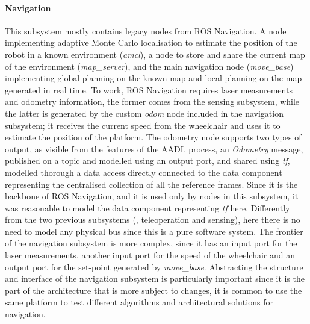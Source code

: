 \paragraph{Navigation} This subsystem mostly contains legacy nodes from ROS Navigation. A node implementing adaptive Monte Carlo localisation to estimate the position of the robot in a known environment (\textit{amcl}), a node to store and share the current map of the environment (\textit{map\_server}), and the main navigation node (\textit{move\_base}) implementing global planning on the known map and local planning on the map generated in real time. To work, ROS Navigation requires laser measurements and odometry information, the former comes from the sensing subsystem, while the latter is generated by the custom \textit{odom} node included in the navigation subsystem; it receives the current speed from the wheelchair and uses it to estimate the position of the platform. The odometry node supports two types of output, as visible from the features of the AADL process, an \textit{Odometry} message, published on a topic and modelled using an output port, and shared using \textit{tf}, modelled thorough a data access directly connected to the data component representing the centralised collection of all the reference frames. Since it is the backbone of ROS Navigation, and it is used only by nodes in this subsystem, it was reasonable to model the data component representing \textit{tf} here. Differently from the two previous subsystems (\ie, teleoperation and sensing), here there is no need to model any physical bus since this is a pure software system. The frontier of the navigation subsystem is more complex, since it has an input port for the laser measurements, another input port for the speed of the wheelchair and  an output port for the set-point generated by \textit{move\_base}. Abstracting the structure and interface of the navigation subsystem is particularly important since it is the part of the architecture that is more subject to changes, it is common to use the same platform to test different algorithms and architectural solutions for navigation.

